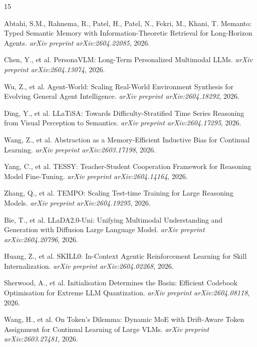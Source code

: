 \documentclass[11pt]{article}
\begin{document}
\begin{thebibliography}{15}

Abtahi, S.M., Rahnema, R., Patel, H., Patel, N., Fekri, M., Khani, T.
\newblock Memanto: Typed Semantic Memory with Information-Theoretic Retrieval for Long-Horizon Agents.
\newblock \emph{arXiv preprint arXiv:2604.22085}, 2026.

Chen, Y., et al.
\newblock PersonaVLM: Long-Term Personalized Multimodal LLMs.
\newblock \emph{arXiv preprint arXiv:2604.13074}, 2026.

Wu, Z., et al.
\newblock Agent-World: Scaling Real-World Environment Synthesis for Evolving General Agent Intelligence.
\newblock \emph{arXiv preprint arXiv:2604.18292}, 2026.

Ding, Y., et al.
\newblock LLaTiSA: Towards Difficulty-Stratified Time Series Reasoning from Visual Perception to Semantics.
\newblock \emph{arXiv preprint arXiv:2604.17295}, 2026.

Wang, Z., et al.
\newblock Abstraction as a Memory-Efficient Inductive Bias for Continual Learning.
\newblock \emph{arXiv preprint arXiv:2603.17198}, 2026.

Yang, C., et al.
\newblock TESSY: Teacher-Student Cooperation Framework for Reasoning Model Fine-Tuning.
\newblock \emph{arXiv preprint arXiv:2604.14164}, 2026.

Zhang, Q., et al.
\newblock TEMPO: Scaling Test-time Training for Large Reasoning Models.
\newblock \emph{arXiv preprint arXiv:2604.19295}, 2026.

Bie, T., et al.
\newblock LLaDA2.0-Uni: Unifying Multimodal Understanding and Generation with Diffusion Large Language Model.
\newblock \emph{arXiv preprint arXiv:2604.20796}, 2026.

Huang, Z., et al.
\newblock SKILL0: In-Context Agentic Reinforcement Learning for Skill Internalization.
\newblock \emph{arXiv preprint arXiv:2604.02268}, 2026.

Sherwood, A., et al.
\newblock Initialisation Determines the Basin: Efficient Codebook Optimisation for Extreme LLM Quantization.
\newblock \emph{arXiv preprint arXiv:2604.08118}, 2026.

Wang, H., et al.
\newblock On Token's Dilemma: Dynamic MoE with Drift-Aware Token Assignment for Continual Learning of Large VLMs.
\newblock \emph{arXiv preprint arXiv:2603.27481}, 2026.

\end{thebibliography}
\end{document}
